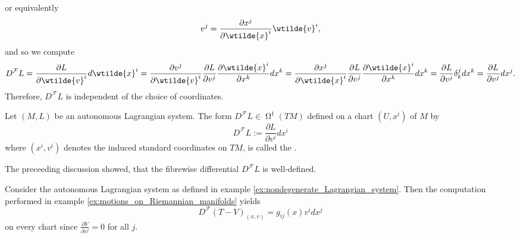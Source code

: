 \noindent or equivalently 
\begin{equation*}
	v^j = \frac{\partial x^j}{\partial \wtilde{x}^i}\wtilde{v}^i,
\end{equation*}
\noindent and so we compute
\begin{equation*}
	D^\mathcal{F}L = \frac{\partial L}{\partial \wtilde{v}^i}d\wtilde{x}^i = \frac{\partial v^j}{\partial \wtilde{v}^i}\frac{\partial L}{\partial v^j}\frac{\partial \wtilde{x}^i}{\partial x^k} dx^k = \frac{\partial x^j}{\partial \wtilde{x}^i}\frac{\partial L}{\partial v^j}\frac{\partial \wtilde{x}^i}{\partial x^k} dx^k = \frac{\partial L}{\partial v^j}\delta^j_k dx^k = \frac{\partial L}{\partial v^j}dx^j.
\end{equation*}
Therefore, $D^\mathcal{F}L$ is independent of the choice of coordinates.

\begin{definition}
	\label{def:fibrewise_differential}
	Let $(M,L)$ be an autonomous Lagrangian system. The form $D^\mathcal{F}L \in \upOmega^1(TM)$ defined on a chart $(U,x^i)$ of $M$ by
	\begin{equation}
		\label{eq:fibrewise_differential}
		D^\mathcal{F}L := \frac{\partial L}{\partial v^i}dx^i
	\end{equation}
	\noindent where $(x^i,v^i)$ denotes the induced standard coordinates on $TM$, is called the .
\end{definition}

\begin{remark}
	The preceeding discussion showed, that the fibrewise differential $D^\mathcal{F}L$ is well-defined.
\end{remark}

\begin{example}
	\label{ex:fibrewise_differential_Riemannian_manifold}
	Consider the autonomous Lagrangian system as defined in example \ref{ex:nondegenerate_Lagrangian_system}. Then the computation performed in example \ref{ex:motions_on_Riemannian_manifolds} yields
	\begin{equation*}
		D^\mathcal{F}(T - V)_{(x,v)} = g_{ij}(x)v^idx^j
	\end{equation*}
	\noindent on every chart since $\frac{\partial V}{\partial v^j} = 0$ for all $j$.
\end{example}

